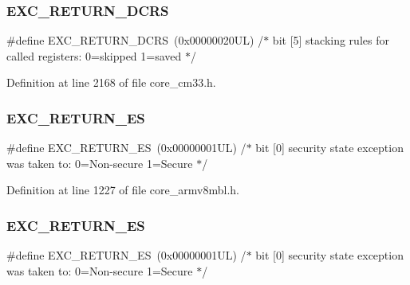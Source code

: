 \subsubsection{\texorpdfstring{E\+X\+C\+\_\+\+R\+E\+T\+U\+R\+N\+\_\+\+D\+C\+RS}{EXC\_RETURN\_DCRS}\hspace{0.1cm}{\footnotesize\ttfamily [5/5]}}
{\footnotesize\ttfamily \#define E\+X\+C\+\_\+\+R\+E\+T\+U\+R\+N\+\_\+\+D\+C\+RS~(0x00000020\+U\+L)     /$\ast$ bit \mbox{[}5\mbox{]} stacking rules for called registers\+: 0=skipped 1=saved       $\ast$/}



Definition at line 2168 of file core\+\_\+cm33.\+h.

\mbox{\label{group___c_m_s_i_s___core___n_v_i_c_functions_gac939dbf69d3063c76a28516a4ae84db7}} 
\subsubsection{\texorpdfstring{E\+X\+C\+\_\+\+R\+E\+T\+U\+R\+N\+\_\+\+ES}{EXC\_RETURN\_ES}\hspace{0.1cm}{\footnotesize\ttfamily [1/5]}}
{\footnotesize\ttfamily \#define E\+X\+C\+\_\+\+R\+E\+T\+U\+R\+N\+\_\+\+ES~(0x00000001\+U\+L)     /$\ast$ bit \mbox{[}0\mbox{]} security state exception was taken to\+: 0=\+Non-\/secure 1=\+Secure $\ast$/}



Definition at line 1227 of file core\+\_\+armv8mbl.\+h.

\mbox{\label{group___c_m_s_i_s___core___n_v_i_c_functions_gac939dbf69d3063c76a28516a4ae84db7}} 
\subsubsection{\texorpdfstring{E\+X\+C\+\_\+\+R\+E\+T\+U\+R\+N\+\_\+\+ES}{EXC\_RETURN\_ES}\hspace{0.1cm}{\footnotesize\ttfamily [2/5]}}
{\footnotesize\ttfamily \#define E\+X\+C\+\_\+\+R\+E\+T\+U\+R\+N\+\_\+\+ES~(0x00000001\+U\+L)     /$\ast$ bit \mbox{[}0\mbox{]} security state exception was taken to\+: 0=\+Non-\/secure 1=\+Secure $\ast$/}




